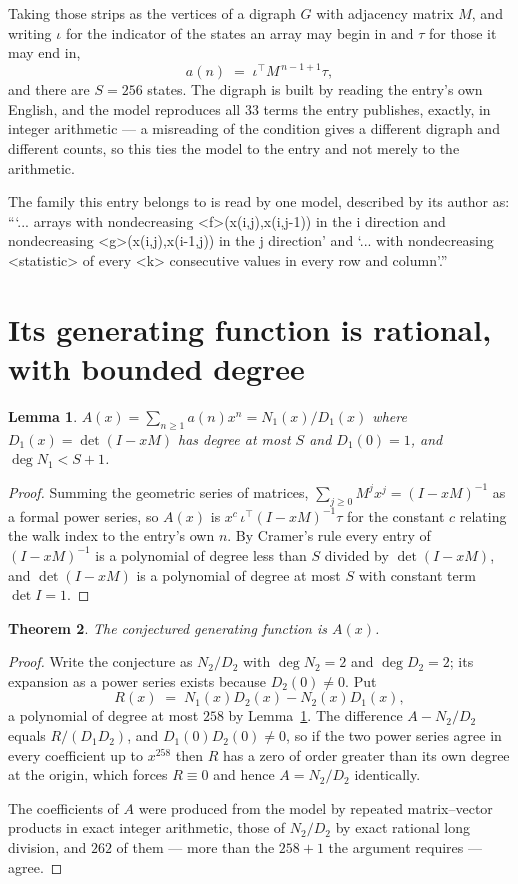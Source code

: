 \documentclass[11pt,a4paper]{article}
\theoremstyle{plain}
\newtheorem{theorem}{Theorem}
\newtheorem{lemma}[theorem]{Lemma}
\theoremstyle{definition}
\begin{document}
Taking those strips as the vertices of a digraph $G$ with adjacency matrix $M$, and writing
$\iota$ for the indicator of the states an array may begin in and $\tau$ for those it may end
in,
\[
a(n)\;=\;\iota^{\!\top}M^{\,n-1+1}\tau ,
\]
and there are $S=256$ states. The digraph is built by reading the entry's own English, and the
model reproduces all $33$ terms the entry publishes, exactly, in integer arithmetic --- a
misreading of the condition gives a different digraph and different counts, so this ties the
model to the entry and not merely to the arithmetic.

The family this entry belongs to is read by one model, described by its author as: ```... arrays with nondecreasing <f>(x(i,j),x(i,j-1)) in the i direction and nondecreasing <g>(x(i,j),x(i-1,j)) in the j direction' and `... with nondecreasing <statistic> of every <k> consecutive values in every row and column'.''


\section{Its generating function is rational, with bounded degree}

\begin{lemma}\label{lem:rat}
$A(x)=\sum_{n\ge1}a(n)x^n=N_1(x)/D_1(x)$ where $D_1(x)=\det(I-xM)$ has degree at most
$S$ and $D_1(0)=1$, and $\deg N_1<S+1$.
\end{lemma}

\begin{proof}
Summing the geometric series of matrices, $\sum_{j\ge0}M^jx^j=(I-xM)^{-1}$ as a formal
power series, so $A(x)$ is $x^{c}\,\iota^{\!\top}(I-xM)^{-1}\tau$ for the constant $c$
relating the walk index to the entry's own $n$. By Cramer's rule every entry of
$(I-xM)^{-1}$ is a polynomial of degree less than $S$ divided by $\det(I-xM)$, and
$\det(I-xM)$ is a polynomial of degree at most $S$ with constant term $\det I=1$.
\end{proof}

\begin{theorem}
The conjectured generating function is $A(x)$.
\end{theorem}

\begin{proof}
Write the conjecture as $N_2/D_2$ with $\deg N_2=2$ and $\deg D_2=2$; its expansion as a
power series exists because $D_2(0)\neq0$. Put
\[
R(x)\;=\;N_1(x)D_2(x)-N_2(x)D_1(x),
\]
a polynomial of degree at most $258$ by Lemma~\ref{lem:rat}. The difference
$A-N_2/D_2$ equals $R/(D_1D_2)$, and $D_1(0)D_2(0)\neq0$, so if the two power series agree in
every coefficient up to $x^{258}$ then $R$ has a zero of order greater than its own
degree at the origin, which forces $R\equiv0$ and hence $A=N_2/D_2$ identically.

The coefficients of $A$ were produced from the model by repeated matrix--vector products in
exact integer arithmetic, those of $N_2/D_2$ by exact rational long division, and $262$
of them --- more than the $258+1$ the argument requires --- agree.
\end{proof}
\end{document}
